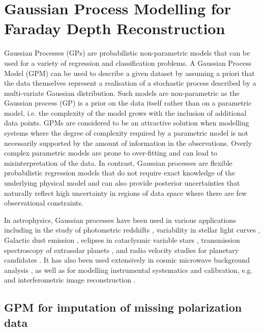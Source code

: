 \documentclass[fleqn,usenatbib]{mnras}
\begin{document}
\section{Gaussian Process Modelling for Faraday Depth Reconstruction}
\label{sec:astrogpm}

Gaussian Processes (GPs) are probabilistic non-parametric models that can be used for a variety of regression and classification problems. A Gaussian Process Model (GPM) can be used to describe a given dataset by assuming a priori that the data themselves represent a realisation of a stochastic process described by a multi-variate Gaussian distribution. Such models are non-parametric as the Gaussian process (GP) is a prior on the data itself rather than on a parametric model, i.e. the complexity of the model grows with the inclusion of additional data points. GPMs are considered to be an attractive solution when modelling systems where the degree of complexity required by a parametric model is not necessarily supported by the amount of information in the observations. Overly complex parametric models are prone to over-fitting and can lead to misinterpretation of the data. In contrast, Gaussian processes are flexible probabilistic regression models that do not require exact knowledge of the underlying physical model and can also provide posterior uncertainties that naturally reflect high uncertainty in regions of data space where there are few observational constraints.

In astrophysics, Gaussian processes have been used in various applications including in the study of photometric redshifts \citep{wa06300n}, variability in stellar light curves \citep{2018MNRAS.474.2094A}, Galactic dust emission \citep{ensslinfromert}, eclipses in cataclysmic variable stars \citep{10.1093/mnras/stw2417}, transmission spectroscopy of extrasolar planets \citep{2012MNRAS.419.2683G}, and radio velocity studies for planetary candidates \citep{10.1093/mnras/stv1428}. It has also been used extensively in cosmic microwave background analysis \citep{1987MNRAS.226..655B, 1999CoScE...1...21B, PhysRevD.67.023001}, as well as for modelling instrumental systematics and calibration, e.g. \cite{2012MNRAS.419.2683G, 2014MNRAS.443.2517H, 2015ApJ...800...46B, Czekala_2015, 2015MNRAS.451..680E, 10.1093/mnras/stv1428, 2015Natur.526..546V, 2016MNRAS.459.2408A, 2016MNRAS.456L...6R, 2017MNRAS.466.4250L} and interferometric image reconstruction \citep{resolve}.

\subsection{GPM for imputation of missing polarization data}
\label{sec:imputation}
\end{document}

